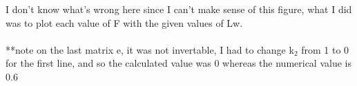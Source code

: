 \documentclass{article}
\begin{document}
I don't know what's wrong here since I can't make sense of this figure, what I did was to plot each value of F with the given values of Lw.\\\\
**note on the last matrix e, it was not invertable, I had to change k$_2$ from 1 to 0 for the first line, and so the calculated value was 0 whereas the numerical value is 0.6
\end{document}

